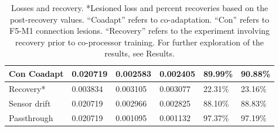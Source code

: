 \documentclass[12pt]{iopart}
\begin{document}
\begin{table}[h]
\begin{tabular}{|l|l|l|l|l|l|}
Con Coadapt    & 0.020719                                                          & 0.002583                                                         & 0.002405                                                             & 89.99\%            & 90.88\%                                                          \\ \hline
Recovery*      & 0.003834                                                          & 0.003105                                                         & 0.003077                                                             & 22.31\%            & 23.16\%                                                          \\ \hline
Sensor drift   & 0.020719                                                          & 0.002966                                                        & 0.002825                                                              & 88.10\%            & 88.83\%                                                          \\ \hline
Passthrough    & 0.020719                                                          & 0.001095                                                        & 0.001132                                                              & 97.37\%            & 97.19\%                                                          \\ \hline
\end{tabular}
\caption{\label{tab:results}Losses and recovery. *Lesioned loss and percent recoveries based on the post-recovery values.
         ``Coadapt'' refers to co-adaptation. ``Con'' refers to F5-M1 connection lesions. ``Recovery'' refers to the
         experiment involving recovery prior to co-processor training.
         For further exploration of the results, see Results.}
\end{table}
\end{document}
